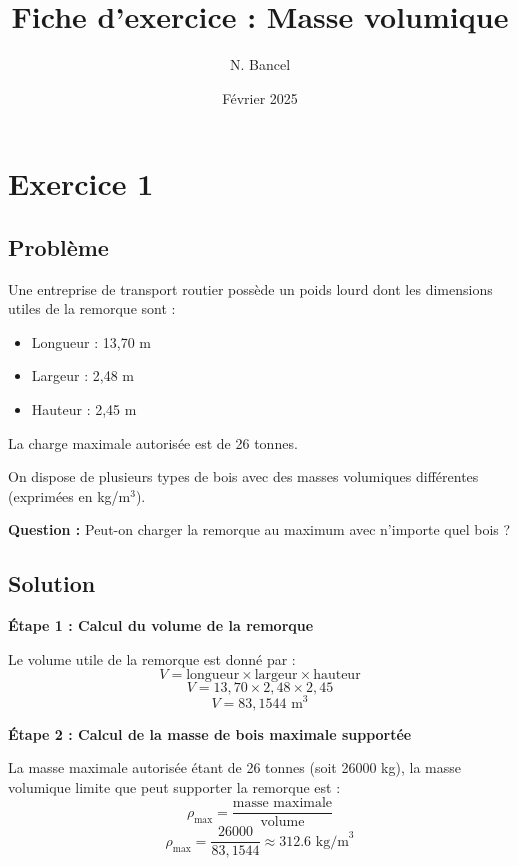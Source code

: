 \documentclass[a4paper,12pt]{article}
\begin{document}
\title{Fiche d'exercice : Masse volumique}
\author{N. Bancel}
\date{Février 2025}

\maketitle

\section{Exercice 1}

\subsection{Problème}

\begin{tcolorbox}[colback=gray!10, colframe=black, title=\textbf{Exercice 1}]
Une entreprise de transport routier possède un poids lourd dont les dimensions utiles de la remorque sont :
\begin{itemize}
    \item Longueur : 13,70 m
    \item Largeur : 2,48 m
    \item Hauteur : 2,45 m
\end{itemize}
La charge maximale autorisée est de 26 tonnes.

On dispose de plusieurs types de bois avec des masses volumiques différentes (exprimées en kg/m$^3$). 

\textbf{Question :} Peut-on charger la remorque au maximum avec n'importe quel bois ?
\end{tcolorbox}

\subsection{Solution}

\textbf{Étape 1 : Calcul du volume de la remorque}

Le volume utile de la remorque est donné par :
\[
V = \text{longueur} \times \text{largeur} \times \text{hauteur}
\]
\[
V = 13,70 \times 2,48 \times 2,45
\]
\[
V = 83,1544 \text{ m}^3
\]

\textbf{Étape 2 : Calcul de la masse de bois maximale supportée}

La masse maximale autorisée étant de 26 tonnes (soit 26000 kg), la masse volumique limite que peut supporter la remorque est :
\[
\rho_{\max} = \frac{\text{masse maximale}}{\text{volume}}
\]
\[
\rho_{\max} = \frac{26000}{83,1544} \approx 312.6 \text{ kg/m}^3
\]
\end{document}
